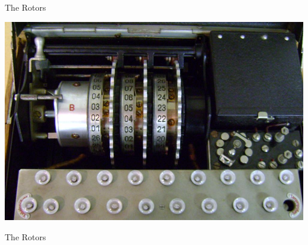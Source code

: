 \documentclass[hyphens,aspectratio=169]{beamer}
\begin{document}
\begin{frame}[fragile]{The Rotors}
	\begin{center}
		\includegraphics[scale=0.28]{paper/images/internals_rotor.jpg}
	\end{center}
\end{frame}

\begin{frame}[fragile]{The Rotors}
	\begin{center}
	\end{center}
\end{frame}
\end{document}

